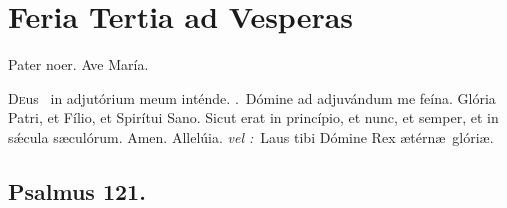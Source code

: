 \documentclass[12pt]{article} %
\newenvironment{response}{\leftskip 0in \setlength{\parindent}{0in}}{\vspace{1 mm}}
\def\vel{\textit{\textcolor{benred8}{vel :}}}
\let\oldRbar\Rbar
\renewcommand{\Rbar}{\textcolor{benred8}{\oldRbar .}}
\let\oldAbar\Abar
\renewcommand{\Abar}{\textcolor{benred8}{\oldAbar .}}
\let\oldgrealtcross\grealtcross
\renewcommand{\grealtcross}{\textcolor{benred8}{\oldgrealtcross}}
\begin{document}
\newpage


\section*{Feria Tertia ad Vesperas}

\begin{center}Pater noer. Ave Mar\'{i}a.\end{center}

\thispagestyle{plain}

\begin{response}\lettrine{D}{e}us \grealtcross\ in adjut\'{o}rium meum int\'{e}nde. \Rbar\ D\'{o}mine ad adjuv\'{a}ndum me fe\'{i}na. Gl\'{o}ria Patri, et F\'{i}lio, et Spir\'{i}tui Sano. Sicut erat in princ\'{i}pio, et nunc, et semper, et in s\'{\ae}cula s\ae cul\'{o}rum. Amen. Allel\'{u}ia. \vel\ Laus tibi D\'{o}mine Rex \ae t\'{e}rn\ae\ gl\'{o}ri\ae .

\end{response}


\subsection*{}



\def\greinitialformat#1{%
{\fontsize{60}{60}\selectfont #1}%
}

\gresetfirstlineaboveinitial{\small \textsc{ \textbf{\textcolor{benred8}{1 \Abar\ IV E}}}}{}%

\def\greinitialformat#1{%
{\fontsize{43}{43}\selectfont #1}%
}

\subsection*{Psalmus 121.}
\end{document}
